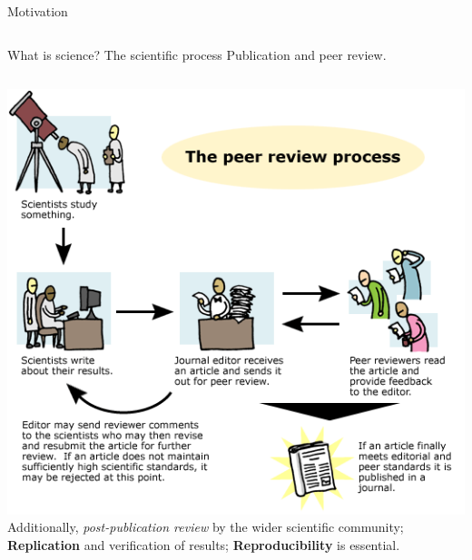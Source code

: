 \documentclass[t]{beamer}
\begin{document}
\begin{ftst}
\begin{columns}[T]
\begin{block}{Motivation}
\end{block}
\end{columns}
\end{ftst}


\begin{ftst}
{What is science?}
{The scientific process}
Publication and peer review.
\begin{columns}[T]
\includegraphics[width=1.15\textwidth]{../figs/peerreview.png}
\bitems Additionally,  \textit{post-publication review} by the wider scientific community;
\spitem \textbf{Replication} and verification of results;
\spitem \textbf{Reproducibility} is essential.
\eitem
\end{columns}
\end{ftst}

\end{document}
